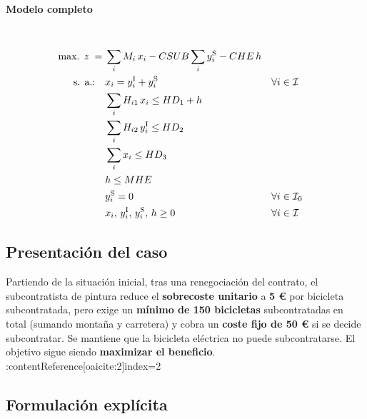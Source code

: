 \paragraph{Modelo completo}\mbox{}\\[-1mm]
\begin{align}
\mbox{max. } z \;=\;& 
\sum_i M_i\,x_i
- CSUB \sum_i y_i^{\mathrm{S}}
- CHE\,h \notag\\
\mbox{s. a.:}\quad
& x_i = y_i^{\mathrm{I}} + y_i^{\mathrm{S}} && \forall i \in \mathcal{I} \notag\\
& \sum_i H_{i1}\,x_i \leq HD_1 + h \notag\\
& \sum_i H_{i2}\,y_i^{\mathrm{I}} \leq HD_2 \notag\\
& \sum_i x_i \leq HD_3 \notag\\
& h \leq MHE \notag\\
& y_i^{\mathrm{S}} = 0 && \forall i \in \mathcal{I}_0 \notag\\
& x_i,\, y_i^{\mathrm{I}},\, y_i^{\mathrm{S}},\, h \geq 0 && \forall i \in \mathcal{I} \notag
\end{align}


\subsection{Presentación del caso}

Partiendo de la situación inicial, tras una renegociación del contrato, el subcontratista de pintura reduce el \textbf{sobrecoste unitario} a \textbf{5 €} por bicicleta subcontratada, pero exige un \textbf{mínimo de 150 bicicletas} subcontratadas en total (sumando montaña y carretera) y cobra un \textbf{coste fijo de 50 €} si se decide subcontratar. Se mantiene que la bicicleta eléctrica no puede subcontratarse. El objetivo sigue siendo \textbf{maximizar el beneficio}. :contentReference[oaicite:2]{index=2}


\subsection{Formulación explícita}

